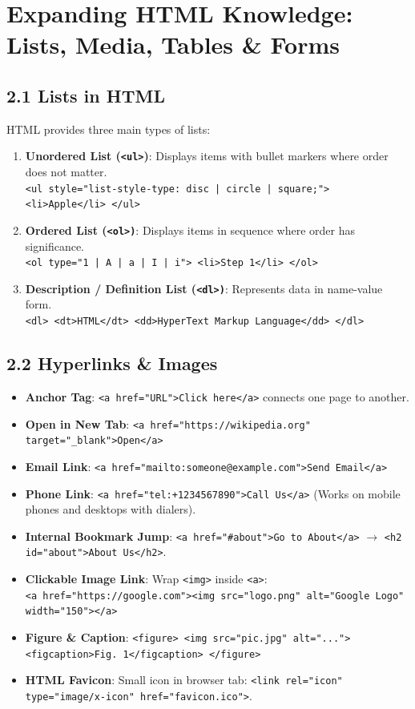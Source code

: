 \chapter{Expanding HTML Knowledge: Lists, Media, Tables \& Forms}

\section{2.1 Lists in HTML}
HTML provides three main types of lists:
\begin{enumerate}[leftmargin=*]
    \item \textbf{Unordered List (\texttt{<ul>})}: Displays items with bullet markers where order does not matter.\\
    \texttt{<ul style="list-style-type: disc | circle | square;"> <li>Apple</li> </ul>}
    \item \textbf{Ordered List (\texttt{<ol>)}}: Displays items in sequence where order has significance.\\
    \texttt{<ol type="1 | A | a | I | i"> <li>Step 1</li> </ol>}
    \item \textbf{Description / Definition List (\texttt{<dl>)}}: Represents data in name-value form.\\
    \texttt{<dl> <dt>HTML</dt> <dd>HyperText Markup Language</dd> </dl>}
\end{enumerate}

\section{2.2 Hyperlinks \& Images}
\begin{itemize}[leftmargin=*]
    \item \textbf{Anchor Tag}: \texttt{<a href="URL">Click here</a>} connects one page to another.
    \item \textbf{Open in New Tab}: \texttt{<a href="https://wikipedia.org" target="\_blank">Open</a>}
    \item \textbf{Email Link}: \texttt{<a href="mailto:someone@example.com">Send Email</a>}
    \item \textbf{Phone Link}: \texttt{<a href="tel:+1234567890">Call Us</a>} (Works on mobile phones and desktops with dialers).
    \item \textbf{Internal Bookmark Jump}: \texttt{<a href="\#about">Go to About</a>} $\to$ \texttt{<h2 id="about">About Us</h2>}.
    \item \textbf{Clickable Image Link}: Wrap \texttt{<img>} inside \texttt{<a>}:\\
    \texttt{<a href="https://google.com"><img src="logo.png" alt="Google Logo" width="150"></a>}
    \item \textbf{Figure \& Caption}: \texttt{<figure> <img src="pic.jpg" alt="..."> <figcaption>Fig. 1</figcaption> </figure>}
    \item \textbf{HTML Favicon}: Small icon in browser tab: \texttt{<link rel="icon" type="image/x-icon" href="favicon.ico">}.
\end{itemize}

